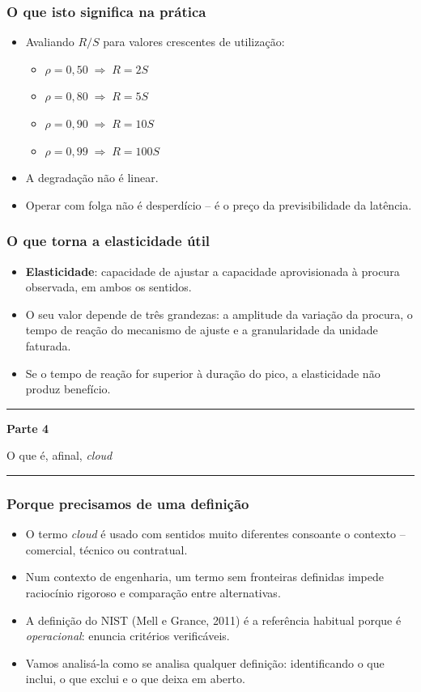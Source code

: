 \documentclass[aspectratio=169]{beamer}
\newcommand{\seccao}[2]{%
  \begin{frame}[plain]
    \vspace*{2.2cm}
    \begin{center}
      {\color{NudeTaupe}\rule{3cm}{0.5pt}}\par
      \vspace{0.6cm}
      {\Huge\bfseries\textcolor{TextEspresso}{#1}}\par
      \vspace{0.5cm}
      {\large\textcolor{NudeTaupe}{#2}}\par
      \vspace{0.6cm}
      {\color{NudeTaupe}\rule{3cm}{0.5pt}}
    \end{center}
  \end{frame}
}
\begin{document}
\begin{frame}
\frametitle{O que isto significa na prática}
\begin{itemize}
    \setlength\itemsep{0.3cm}
    \item Avaliando $R/S$ para valores crescentes de utilização:
    \begin{itemize}
      \item $\rho = 0{,}50 \;\Rightarrow\; R = 2S$
      \item $\rho = 0{,}80 \;\Rightarrow\; R = 5S$
      \item $\rho = 0{,}90 \;\Rightarrow\; R = 10S$
      \item $\rho = 0{,}99 \;\Rightarrow\; R = 100S$
    \end{itemize}
    \item A degradação não é linear.
    \item Operar com folga não é desperdício -- é o preço da previsibilidade da latência.
\end{itemize}
\end{frame}



\begin{frame}
\frametitle{O que torna a elasticidade útil}
\begin{itemize}
    \setlength\itemsep{0.35cm}
    \item \textbf{Elasticidade}: capacidade de ajustar a capacidade aprovisionada à procura observada, em ambos os sentidos.
    \item O seu valor depende de três grandezas: a amplitude da variação da procura, o tempo de reação do mecanismo de ajuste e a granularidade da unidade faturada.
    \item Se o tempo de reação for superior à duração do pico, a elasticidade não produz benefício.
\end{itemize}
\end{frame}

\seccao{Parte 4}{O que é, afinal, \emph{cloud}}

\begin{frame}
\frametitle{Porque precisamos de uma definição}
\begin{itemize}
    \setlength\itemsep{0.35cm}
    \item O termo \emph{cloud} é usado com sentidos muito diferentes consoante o contexto -- comercial, técnico ou contratual.
    \item Num contexto de engenharia, um termo sem fronteiras definidas impede raciocínio rigoroso e comparação entre alternativas.
    \item A definição do NIST (Mell e Grance, 2011) é a referência habitual porque é \emph{operacional}: enuncia critérios verificáveis.
    \item Vamos analisá-la como se analisa qualquer definição: identificando o que inclui, o que exclui e o que deixa em aberto.
\end{itemize}
\end{frame}
\end{document}
